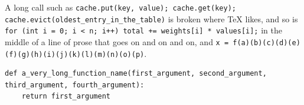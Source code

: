 \documentclass{article}
\begin{document}
A long call such as \lstinline{cache.put(key, value); cache.get(key); cache.evict(oldest_entry_in_the_table)} is
broken where TeX likes, and so is \lstinline[breakatwhitespace]{for (int i = 0; i < n; i++) total += weights[i] * values[i];}
in the middle of a line of prose that goes on and on and on, and \lstinline[breakindent=1em]!x = f(a)(b)(c)(d)(e)(f)(g)(h)(i)(j)(k)(l)(m)(n)(o)(p)!.
\begin{lstlisting}
def a_very_long_function_name(first_argument, second_argument, third_argument, fourth_argument):
    return first_argument
\end{lstlisting}
\end{document}
